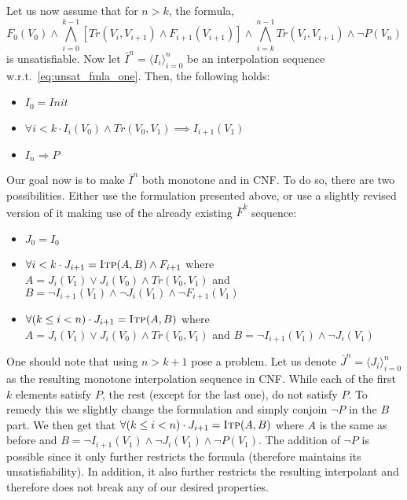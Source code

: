 \documentclass{article}
\newcommand{\itp}{\textsc{Itp}}
\newcommand{\Tr}{\mathit{Tr}}
\newcommand{\Init}{\mathit{Init}}
\begin{document}
Let us now assume that for $n > k$, the formula,
\begin{equation}
  \label{eq:unsat_fmla_one}
	F_0(V_0)\land\bigwedge_{i=0}^{k-1}[ \Tr(V_i,V_{i+1})\land F_{i+1}(V_{i+1})]\land\bigwedge_{i=k}^{n-1} \Tr(V_i,V_{i+1})\land\neg P(V_n)
\end{equation}
is unsatisfiable. Now let $\bar{I}^n = \langle I_i \rangle_{i=0}^n$ be
an interpolation sequence w.r.t.~\eqref{eq:unsat_fmla_one}. Then, the
following holds:
\begin{itemize}
	\item $I_0 = \Init$
	\item $\forall i < k \cdot I_i(V_0) \land \Tr(V_0, V_1) \implies I_{i+1}(V_1)$
	\item $I_n\Rightarrow P$
\end{itemize}

Our goal now is to make $\bar{I}^n$ both monotone and in CNF. To do so, there are two possibilities. Either use the formulation presented above, or use a slightly revised version of it making use of the already existing $\bar{F}^k$ sequence:

\begin{itemize}
	\item $J_0 = I_0$
	\item $\forall i < k \cdot J_{i+1} = \itp (A,B)\land F_{i+1}$ where \\$A = J_i(V_1) \lor J_i(V_0) \land \Tr(V_0,V_1)$ and $B = \neg I_{i+1}(V_1) \land \neg J_i(V_1)\land\neg F_{i+1}(V_1)$
	\item $\forall (k\leq i < n) \cdot J_{i+1} = \itp (A,B)$ where \\$A = J_i(V_1) \lor J_i(V_0) \land \Tr(V_0,V_1)$ and $B = \neg I_{i+1}(V_1) \land \neg J_i(V_1)$
\end{itemize}

One should note that using $n > k+1$ pose a problem. Let us denote $\bar{J}^n = \langle J_i \rangle_{i=0}^n$ as the resulting monotone interpolation sequence in CNF. While each of the first $k$ elements satisfy $P$, the rest (except for the last one), do not satisfy $P$. To remedy this we slightly change the formulation and simply conjoin $\neg P$ in the $B$ part. We then get that $\forall (k\leq i < n) \cdot J_{i+1} = \itp (A,B)$ where $A$ is the same as before and $B = \neg I_{i+1}(V_1) \land \neg J_i(V_1)\land\neg P(V_1)$. The addition of $\neg P$ is possible since it only further restricts the formula (therefore maintains its unsatisfiability). In addition, it also further restricts the resulting interpolant and therefore does not break any of our desired properties.
\end{document}
